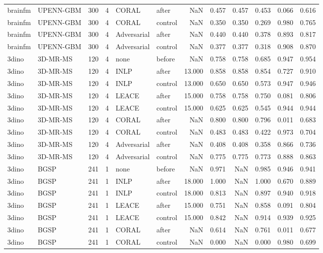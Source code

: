 \begin{tabular}{llrrllrrrrrr}
brainfm & UPENN-GBM & 300 & 4 & CORAL & after & NaN & 0.457 & 0.457 & 0.453 & 0.066 & 0.616 \\
brainfm & UPENN-GBM & 300 & 4 & CORAL & control & NaN & 0.350 & 0.350 & 0.269 & 0.980 & 0.765 \\
brainfm & UPENN-GBM & 300 & 4 & Adversarial & after & NaN & 0.440 & 0.440 & 0.378 & 0.893 & 0.817 \\
brainfm & UPENN-GBM & 300 & 4 & Adversarial & control & NaN & 0.377 & 0.377 & 0.318 & 0.908 & 0.870 \\
3dino & 3D-MR-MS & 120 & 4 & none & before & NaN & 0.758 & 0.758 & 0.685 & 0.947 & 0.954 \\
3dino & 3D-MR-MS & 120 & 4 & INLP & after & 13.000 & 0.858 & 0.858 & 0.854 & 0.727 & 0.910 \\
3dino & 3D-MR-MS & 120 & 4 & INLP & control & 13.000 & 0.650 & 0.650 & 0.573 & 0.947 & 0.946 \\
3dino & 3D-MR-MS & 120 & 4 & LEACE & after & 15.000 & 0.758 & 0.758 & 0.750 & 0.081 & 0.806 \\
3dino & 3D-MR-MS & 120 & 4 & LEACE & control & 15.000 & 0.625 & 0.625 & 0.545 & 0.944 & 0.944 \\
3dino & 3D-MR-MS & 120 & 4 & CORAL & after & NaN & 0.800 & 0.800 & 0.796 & 0.011 & 0.683 \\
3dino & 3D-MR-MS & 120 & 4 & CORAL & control & NaN & 0.483 & 0.483 & 0.422 & 0.973 & 0.704 \\
3dino & 3D-MR-MS & 120 & 4 & Adversarial & after & NaN & 0.408 & 0.408 & 0.358 & 0.866 & 0.736 \\
3dino & 3D-MR-MS & 120 & 4 & Adversarial & control & NaN & 0.775 & 0.775 & 0.773 & 0.888 & 0.863 \\
3dino & BGSP & 241 & 1 & none & before & NaN & 0.971 & NaN & 0.985 & 0.946 & 0.941 \\
3dino & BGSP & 241 & 1 & INLP & after & 18.000 & 1.000 & NaN & 1.000 & 0.670 & 0.889 \\
3dino & BGSP & 241 & 1 & INLP & control & 18.000 & 0.813 & NaN & 0.897 & 0.940 & 0.918 \\
3dino & BGSP & 241 & 1 & LEACE & after & 15.000 & 0.751 & NaN & 0.858 & 0.091 & 0.804 \\
3dino & BGSP & 241 & 1 & LEACE & control & 15.000 & 0.842 & NaN & 0.914 & 0.939 & 0.925 \\
3dino & BGSP & 241 & 1 & CORAL & after & NaN & 0.614 & NaN & 0.761 & 0.011 & 0.677 \\
3dino & BGSP & 241 & 1 & CORAL & control & NaN & 0.000 & NaN & 0.000 & 0.980 & 0.699 \\

\end{tabular}

